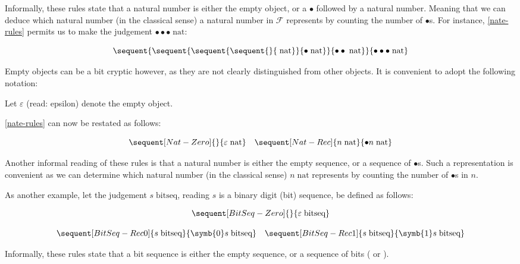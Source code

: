Informally, these rules state that a natural number is either the empty object,
or a $\bullet$ followed by a natural number. Meaning that we can deduce which
natural number (in the classical sense) a natural number in $\mathcal{F}$
represents by counting the number of $\bullet$s. For instance, \ref{nate-rules}
permits us to make the judgement $\bullet\bullet\bullet\;\text{nat}$:

$$
\sequent{
  \sequent{
    \sequent{
      \sequent{
      }{\;\text{nat}}
    }{\bullet\;\text{nat}}
  }{\bullet\bullet\;\text{nat}}
}{\bullet\bullet\bullet\;\text{nat}}
$$

Empty objects can be a bit cryptic however, as they are not clearly
distinguished from other objects. It is convenient to adopt the following
notation:

\begin{definition}
Let $\varepsilon$ (read: epsilon) denote the empty object.
\end{definition}

\ref{nate-rules} can now be restated as follows:

\begin{equation}\label{nat-rules}
\sequent[Nat-Zero]{}{\varepsilon\;\text{nat}}
\quad
\sequent[Nat-Rec]{n\;\text{nat}}{\bullet n\;\text{nat}}
\end{equation}

Another informal reading of these rules is that a natural number is either the
empty sequence, or a sequence of $\bullet$s. Such a representation is
convenient as we can determine which natural number (in the classical sense)
$n\;\text{nat}$ represents by counting the number of $\bullet$s in $n$.

As another example, let the judgement $s\;\text{bitseq}$, reading $s$ is a
binary digit (bit) sequence, be defined as follows:

\begin{align}\label{bitseq-rules}
\begin{array}{c}
\sequent[BitSeq-Zero]{}{\varepsilon\;\text{bitseq}}
\\ \\
\sequent[BitSeq-Rec0]{s\;\text{bitseq}}{\symb{0} s\;\text{bitseq}}
\quad
\sequent[BitSeq-Rec1]{s\;\text{bitseq}}{\symb{1} s\;\text{bitseq}}
\end{array}
\end{align}

Informally, these rules state that a bit sequence is either the empty sequence,
or a sequence of bits ( or ).

